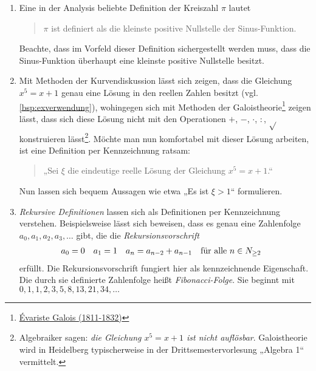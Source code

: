 \begin{bsp} \label{zeichendefinieren} \quad
    \begin{enumerate}
        \item Eine in der Analysis beliebte Definition der Kreiszahl $\pi$ lautet
        \begin{quote}
            $\pi$ ist definiert als die kleinste positive Nullstelle der Sinus-Funktion.
        \end{quote}
        Beachte, dass im Vorfeld dieser Definition sichergestellt werden muss, dass die Sinus-Funktion überhaupt eine kleinste positive Nullstelle besitzt.
        \item Mit Methoden der Kurvendiskussion lässt sich zeigen, dass die Gleichung $x^5=x+1$ genau eine Lösung in den reellen Zahlen besitzt (vgl. \cref{bsp:exverwendung}), wohingegen sich mit Methoden der Galoistheorie\footnote{\href{https://de.wikipedia.org/wiki/\%C3\%89variste_Galois}{Évariste Galois (1811-1832)}} zeigen lässt, dass sich diese Lösung nicht mit den Operationen $+$, $-$, $\cdot$, $:$, $\sqrt{}$ konstruieren lässt\footnote{Algebraiker sagen: \emph{die Gleichung $x^5=x+1$ ist nicht auflösbar}. Galoistheorie wird in Heidelberg typischerweise in der Drittsemestervorlesung „Algebra 1“ vermittelt.}. Möchte man nun komfortabel mit dieser Lösung arbeiten, ist eine Definition per Kennzeichnung ratsam:
        \begin{quote}
            „Sei $\xi$ die eindeutige reelle Lösung der Gleichung $x^5=x+1$.“
        \end{quote}
        Nun lassen sich bequem Aussagen wie etwa „Es ist $\xi>1$“ formulieren.
        \item \emph{Rekursive Definitionen} lassen sich als Definitionen per Kennzeichnung verstehen. Beispielsweise lässt sich beweisen, dass es genau eine Zahlenfolge $a_0,a_1,a_2,a_3,\dots$ gibt, die die \emph{Rekursionsvorschrift}
        \begin{align*}
            a_0 & = 0 & a_1 & = 1 & a_n & = a_{n-2} + a_{n-1}  && \text{für alle}\ n\in \relax N_{\ge 2}
        \end{align*}
        erfüllt. Die Rekursionsvorschrift fungiert hier als kennzeichnende Eigenschaft. Die durch sie definierte Zahlenfolge heißt \emph{Fibonacci-Folge}. Sie beginnt mit $0,1,1,2,3,5,8,13,21,34,\dots$
    \end{enumerate}
\end{bsp}


